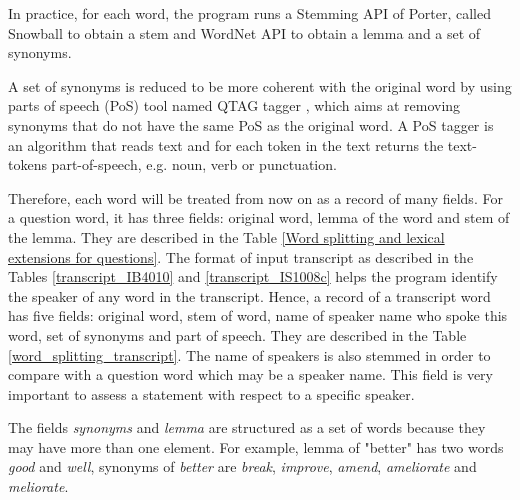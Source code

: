 In practice, for each word, the program runs a Stemming API of Porter, called Snowball \cite{porter2001ss} to obtain a stem and WordNet API \cite{pasca2001irw} to obtain a lemma and a set of synonyms.

A set of synonyms is reduced to be more coherent with the original word by using parts of speech (PoS) tool named QTAG tagger \cite{manson1997qpp}, which aims at removing synonyms that do not have the same PoS as the original word. A PoS tagger is an algorithm that reads text and for each token in the text returns the text-tokens part-of-speech, e.g. noun, verb or punctuation. 

Therefore, each word will be treated from now on as a record of many fields. For a question word, it has three fields: original word, lemma of the word and stem of the lemma. They are described in the Table \ref{Word splitting and lexical extensions for questions}. The format of input transcript as described in the Tables \ref{transcript_IB4010} and \ref{transcript_IS1008c} helps the program identify the speaker of any word in the transcript. Hence, a record of a transcript word has five fields: original word, stem of word, name of speaker name who spoke this word, set of synonyms and part of speech. They are described in the Table \ref{word_splitting_transcript}. The name of speakers is also stemmed in order to compare with a question word which may be a speaker name. This field is very important to assess a statement with respect to a specific speaker.

The fields \textit{synonyms} and \textit{lemma} are structured as a set of words because they may have more than one element. For example, lemma of "better" has two words \textit{good} and \textit{well}, synonyms of \textit{better} are \textit{break}, \textit{improve}, \textit{amend}, \textit{ameliorate} and \textit{meliorate}.


